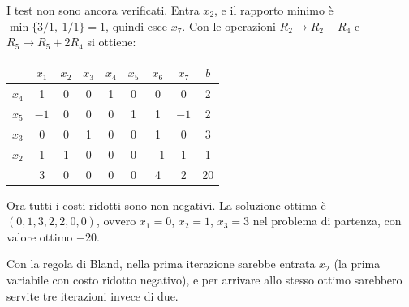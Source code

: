 I test non sono ancora verificati. Entra $x_2$, e il rapporto minimo è $\min\{3/1,\ 1/1\} = 1$, quindi esce $x_7$. Con le operazioni $R_2 \to R_2 - R_4$ e $R_5 \to R_5 + 2R_4$ si ottiene:
\begin{center}
\begin{tabular}{c|ccccccc|c}
 & $x_1$ & $x_2$ & $x_3$ & $x_4$ & $x_5$ & $x_6$ & $x_7$ & $b$ \\
\hline
$x_4$ & 1 & 0 & 0 & 1 & 0 & 0 & 0 & 2 \\
$x_5$ & $-1$ & 0 & 0 & 0 & 1 & 1 & $-1$ & 2 \\
$x_3$ & 0 & 0 & 1 & 0 & 0 & 1 & 0 & 3 \\
$x_2$ & 1 & 1 & 0 & 0 & 0 & $-1$ & 1 & 1 \\
\hline
 & 3 & 0 & 0 & 0 & 0 & 4 & 2 & 20 \\
\end{tabular}
\end{center}
Ora tutti i costi ridotti sono non negativi. La soluzione ottima è $(0, 1, 3, 2, 2, 0, 0)$, ovvero $x_1 = 0$, $x_2 = 1$, $x_3 = 3$ nel problema di partenza, con valore ottimo $-20$.

Con la regola di Bland, nella prima iterazione sarebbe entrata $x_2$ (la prima variabile con costo ridotto negativo), e per arrivare allo stesso ottimo sarebbero servite tre iterazioni invece di due.

